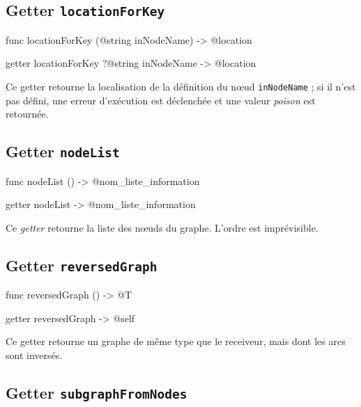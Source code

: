\subsection{Getter \texttt{locationForKey}}

\begin{galgas4}
func locationForKey (@string inNodeName) -> @location
\end{galgas4}

\begin{galgas3}
getter locationForKey ?@string inNodeName -> @location
\end{galgas3}

Ce getter retourne la localisation de la définition du nœud \texttt{inNodeName} ; si il n'est pas défini, une erreur d'exécution est déclenchée et une valeur \emph{poison} est retournée.


\subsection{Getter \texttt{nodeList}}

\begin{galgas4}
func nodeList () -> @nom_liste_information
\end{galgas4}

\begin{galgas3}
getter nodeList -> @nom_liste_information
\end{galgas3}

Ce \emph{getter} retourne la liste des nœuds du graphe. L'ordre est imprévisible.




\subsection{Getter \texttt{reversedGraph}}

\begin{galgas4}
func reversedGraph () -> @T
\end{galgas4}

\begin{galgas3}
getter reversedGraph -> @self
\end{galgas3}

Ce getter retourne un graphe de même type que le receiveur, mais dont les arcs sont inversés.





\subsection{Getter \texttt{subgraphFromNodes}}

